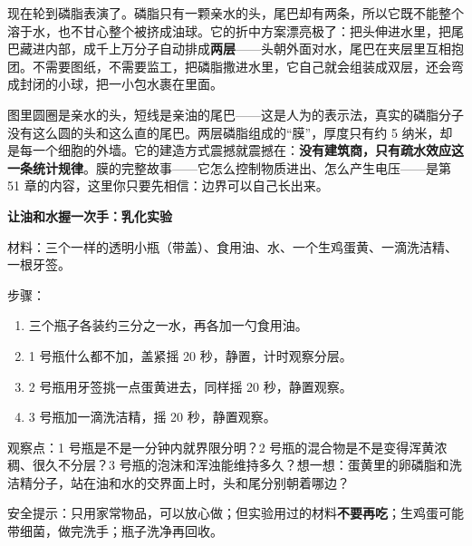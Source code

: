 现在轮到磷脂表演了。磷脂只有一颗亲水的头，尾巴却有两条，所以它既不能整个溶于水，也不甘心整个被挤成油球。它的折中方案漂亮极了：把头伸进水里，把尾巴藏进内部，成千上万分子自动排成\textbf{两层}——头朝外面对水，尾巴在夹层里互相抱团。不需要图纸，不需要监工，把磷脂撒进水里，它自己就会组装成双层，还会弯成封闭的小球，把一小包水裹在里面。

\begin{center}
\end{center}

图里圆圈是亲水的头，短线是亲油的尾巴——这是人为的表示法，真实的磷脂分子没有这么圆的头和这么直的尾巴。两层磷脂组成的“膜”，厚度只有约 5 纳米，却是每一个细胞的外墙。它的建造方式震撼就震撼在：\textbf{没有建筑商，只有疏水效应这一条统计规律}。膜的完整故事——它怎么控制物质进出、怎么产生电压——是第 51 章的内容，这里你只要先相信：边界可以自己长出来。

\begin{shiyan}
\textbf{让油和水握一次手：乳化实验}

材料：三个一样的透明小瓶（带盖）、食用油、水、一个生鸡蛋黄、一滴洗洁精、一根牙签。

步骤：
\begin{enumerate}[itemsep=1pt]
\item 三个瓶子各装约三分之一水，再各加一勺食用油。
\item 1 号瓶什么都不加，盖紧摇 20 秒，静置，计时观察分层。
\item 2 号瓶用牙签挑一点蛋黄进去，同样摇 20 秒，静置观察。
\item 3 号瓶加一滴洗洁精，摇 20 秒，静置观察。
\end{enumerate}

观察点：1 号瓶是不是一分钟内就界限分明？2 号瓶的混合物是不是变得浑黄浓稠、很久不分层？3 号瓶的泡沫和浑浊能维持多久？想一想：蛋黄里的卵磷脂和洗洁精分子，站在油和水的交界面上时，头和尾分别朝着哪边？

安全提示：只用家常物品，可以放心做；但实验用过的材料\textbf{不要再吃}；生鸡蛋可能带细菌，做完洗手；瓶子洗净再回收。
\end{shiyan}

